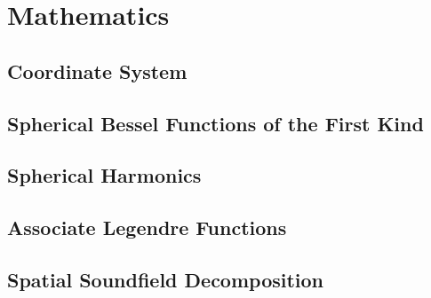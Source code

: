 \chapter{Mathematics}

\section{Coordinate System}
\section{Spherical Bessel Functions of the First Kind}
\section{Spherical Harmonics}
\section{Associate Legendre Functions}
\section{Spatial Soundfield Decomposition}










